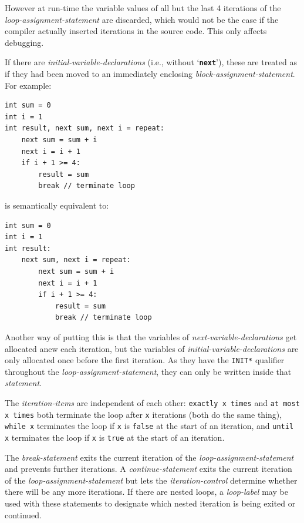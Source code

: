 \documentclass[12pt]{article}
\newcommand{\TT}[1]{{\tt \bfseries #1}}
\newenvironment{indpar}[1][0.3in]%
	{\begin{list}{}%
		     {\setlength{\itemsep}{0in}%
		      \setlength{\topsep}{0in}%
		      \setlength{\parsep}{1ex}%
		      \setlength{\labelwidth}{#1}%
		      \setlength{\leftmargin}{#1}%
		      \addtolength{\leftmargin}{\labelsep}}%
	 \item}%
	{\end{list}}
\begin{document}
However at run-time the variable values of all but the
last 4 iterations of the {\em loop-assignment-statement}
are discarded, which would not be the case if the compiler
actually inserted iterations in the source code.
This only affects debugging.

If there are {\em initial-variable-declarations} (i.e., without
`\TT{next}'), these are
treated as if they had been moved to an immediately enclosing
{\em block-assignment-statement}.  For example:
\begin{indpar}\begin{verbatim}
int sum = 0
int i = 1
int result, next sum, next i = repeat:
    next sum = sum + i
    next i = i + 1
    if i + 1 >= 4:
        result = sum
        break // terminate loop
\end{verbatim}\end{indpar}
is semantically equivalent to:
\begin{indpar}\begin{verbatim}
int sum = 0
int i = 1
int result:
    next sum, next i = repeat:
        next sum = sum + i
        next i = i + 1
        if i + 1 >= 4:
            result = sum
            break // terminate loop
\end{verbatim}\end{indpar}

Another way of putting this is that the variables of
{\em next-variable-declarations} get allocated anew each
iteration, but the variables of {\em initial-variable-declarations}
are only allocated once before the first iteration.  As they
have the {\tt *INIT*} qualifier throughout the
{\em loop-assignment-statement}, they can only be written
inside that {\em statement}.

The {\em iteration-items} are independent of each other:
{\tt exactly x times} and {\tt at most x times} both terminate
the loop after {\tt x} iterations (both do the same thing),
{\tt while x} terminates
the loop if {\tt x} is {\tt false} at the start of an iteration,
and {\tt until x} terminates
the loop if {\tt x} is {\tt true} at the start of an iteration.

The {\em break-statement} exits the current iteration of the
{\em loop-assignment-statement} and prevents further iterations.
A {\em continue-statement} exits the current iteration of the
{\em loop-assignment-statement} but lets the
{\em iteration-control} determine whether there will be any
more iterations.  If there are nested loops, a {\em loop-label}
may be used with these statements to designate which nested iteration
is being exited or continued.
\end{document}

